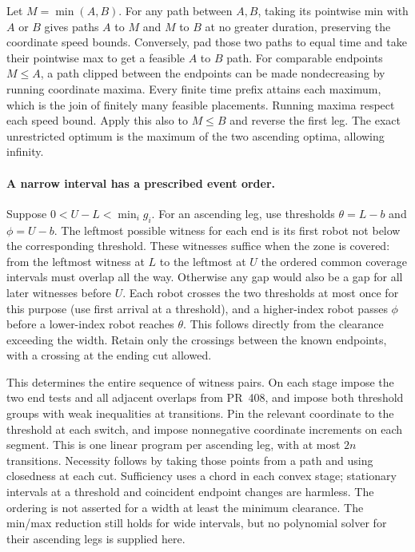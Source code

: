 \documentclass{article}
\begin{document}
Let $M=\min(A,B)$. For any path between $A,B$, taking its pointwise
min with $A$ or $B$ gives paths $A$ to $M$ and $M$ to $B$ at no
greater duration, preserving the coordinate speed bounds.
Conversely, pad those two paths to equal time and take their
pointwise max to get a feasible $A$ to $B$ path. For comparable
endpoints $M\le A$, a path clipped between the endpoints can be
made nondecreasing by running coordinate maxima. Every finite
time prefix attains each maximum, which is the join of finitely
many feasible placements. Running maxima respect each speed
bound. Apply this also to $M\le B$ and reverse the first leg.
The exact unrestricted optimum is the maximum of the two
ascending optima, allowing infinity.

\paragraph{A narrow interval has a prescribed event order.}
Suppose $0<U-L<\min_i g_i$. For an ascending leg, use thresholds
$\theta=L-b$ and $\phi=U-b$. The leftmost possible witness for
each end is its first robot not below the corresponding threshold.
These witnesses suffice when the zone is covered: from the
leftmost witness at $L$ to the leftmost at $U$ the ordered common
coverage intervals must overlap all the way. Otherwise any gap
would also be a gap for all later witnesses before $U$.
Each robot crosses the two thresholds at most once for this purpose
(use first arrival at a threshold), and a higher-index robot
passes $\phi$ before a lower-index robot reaches $\theta$.
This follows directly from the clearance exceeding the width.
Retain only the crossings between the known endpoints, with a
crossing at the ending cut allowed.

This determines the entire sequence of witness pairs. On each
stage impose the two end tests and all adjacent overlaps from
PR~408, and impose both threshold groups with weak inequalities
at transitions. Pin the relevant coordinate to the threshold at
each switch, and impose nonnegative coordinate increments on
each segment. This is one linear program per ascending leg,
with at most $2n$ transitions. Necessity follows by taking those
points from a path and using closedness at each cut. Sufficiency
uses a chord in each convex stage; stationary intervals at a
threshold and coincident endpoint changes are harmless. The
ordering is not asserted for a width at least the minimum clearance.
The min/max reduction still holds for wide intervals, but no
polynomial solver for their ascending legs is supplied here.
\end{document}
